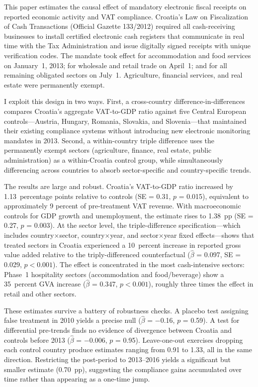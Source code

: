 \documentclass[12pt]{article}
\begin{document}
This paper estimates the causal effect of mandatory electronic fiscal receipts on reported economic activity and VAT compliance. Croatia's Law on Fiscalization of Cash Transactions (Official Gazette 133/2012) required all cash-receiving businesses to install certified electronic cash registers that communicate in real time with the Tax Administration and issue digitally signed receipts with unique verification codes. The mandate took effect for accommodation and food services on January~1, 2013; for wholesale and retail trade on April~1; and for all remaining obligated sectors on July~1. Agriculture, financial services, and real estate were permanently exempt.

I exploit this design in two ways. First, a cross-country difference-in-differences compares Croatia's aggregate VAT-to-GDP ratio against five Central European controls---Austria, Hungary, Romania, Slovakia, and Slovenia---that maintained their existing compliance systems without introducing new electronic monitoring mandates in 2013. Second, a within-country triple difference uses the permanently exempt sectors (agriculture, finance, real estate, public administration) as a within-Croatia control group, while simultaneously differencing across countries to absorb sector-specific and country-specific trends.

The results are large and robust. Croatia's VAT-to-GDP ratio increased by 1.13~percentage points relative to controls (SE = 0.31, $p$ = 0.015), equivalent to approximately 9 percent of pre-treatment VAT revenue. With macroeconomic controls for GDP growth and unemployment, the estimate rises to 1.38~pp (SE = 0.27, $p$ = 0.003). At the sector level, the triple-difference specification---which includes country$\times$sector, country$\times$year, and sector$\times$year fixed effects---shows that treated sectors in Croatia experienced a 10~percent increase in reported gross value added relative to the triply-differenced counterfactual ($\hat{\beta}$ = 0.097, SE = 0.029, $p < 0.001$). The effect is concentrated in the most cash-intensive sectors: Phase~1 hospitality sectors (accommodation and food/beverage) show a 35~percent GVA increase ($\hat{\beta}$ = 0.347, $p < 0.001$), roughly three times the effect in retail and other sectors.

These estimates survive a battery of robustness checks. A placebo test assigning false treatment in 2010 yields a precise null ($\hat{\beta}$ = $-$0.16, $p$ = 0.59). A test for differential pre-trends finds no evidence of divergence between Croatia and controls before 2013 ($\hat{\beta}$ = $-$0.006, $p$ = 0.95). Leave-one-out exercises dropping each control country produce estimates ranging from 0.91 to 1.33, all in the same direction. Restricting the post-period to 2013--2016 yields a significant but smaller estimate (0.70~pp), suggesting the compliance gains accumulated over time rather than appearing as a one-time jump.
\end{document}
